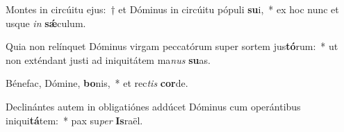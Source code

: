 \item Montes in circúitu ejus:~† et Dóminus in circúitu pópuli \textbf{su}i,~* ex hoc nunc et usque \textit{in} \textbf{sǽ}culum.
\item Quia non relínquet Dóminus virgam peccatórum super sortem jus\textbf{tó}rum:~* ut non exténdant justi ad iniquitátem ma\textit{nus} \textbf{su}as.
\item Bénefac, Dómine, \textbf{bo}nis,~* et rec\textit{tis} \textbf{cor}de.
\item Declinántes autem in obligatiónes addúcet Dóminus cum operántibus iniqui\textbf{tá}tem:~* pax su\textit{per} \textbf{Is}raël.
